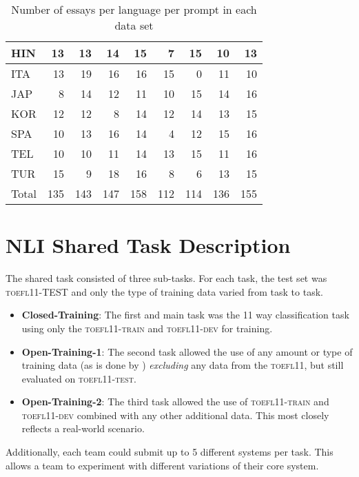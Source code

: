 \documentclass[11pt,letterpaper]{article}
\begin{document}
\begin{table*}[ht]
\begin{small}
\begin{center}
{\begin{tabular}{lrrrrrrrr}
            HIN      &   13 & 13 & 14 & 15 & 7  & 15 & 10 & 13 \\ \hline
            ITA    &   13 & 19 & 16 & 16 & 15 & 0  & 11 & 10 \\ \hline
            JAP   &   8  & 14 & 12 & 11 & 10 & 15 & 14 & 16 \\ \hline
            KOR     &   12 & 12 & 8  & 14 & 12 & 14 & 13 & 15 \\ \hline
            SPA    &   10 & 13 & 16 & 14 & 4  & 12 & 15 & 16 \\ \hline
            TEL     &   10 & 10 & 11 & 14 & 13 & 15 & 11 & 16 \\ \hline
            TUR    &   15 & 9  & 18 & 16 & 8  & 6  & 13 & 15 \\ \hline \hline
            Total      &   135&143 & 147& 158& 112& 114& 136& 155 \\ \hline
        \end{tabular}
}
\end{center}
\end{small}
\caption{Number of essays per language per prompt in each data set}
\end{table*}


\section{NLI Shared Task Description}

The shared task consisted of three sub-tasks. For each task, the
test set was \textsc{toefl11-TEST} and only the type of training data varied from
task to task.

\begin{itemize}
\item {\bf Closed-Training}:  The first and main task was the 11 way
classification task using only the \textsc{toefl11-train} and \textsc{toefl11-dev} for training.
\item {\bf Open-Training-1}: The second task allowed the use of any amount or
type of training data (as is done by )
\emph{excluding} any data from the \textsc{toefl11}, but still evaluated on \textsc{toefl11-test}.
\item {\bf Open-Training-2}: The third task allowed the use of \textsc{toefl11-train} and
\textsc{toefl11-dev} combined with any other additional data. This most closely reflects
a real-world scenario.
\end{itemize}

Additionally, each team could submit up to 5 different
systems per task.  This allows a team to experiment with different
variations of their core system.
\end{document}
